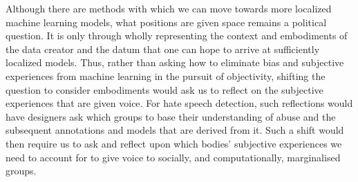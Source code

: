 Although there are methods with which we can move towards more localized machine learning models, what positions are given space remains a political question.
It is only through wholly representing the context and embodiments of the data creator and the datum that one can hope to arrive at sufficiently localized models. Thus, rather than asking how to eliminate bias and subjective experiences from machine learning in the pursuit of objectivity, shifting the question to consider embodiments would ask us to reflect on the subjective experiences that are given voice. For hate speech detection, such reflections would have designers ask which groups to base their understanding of abuse and the subsequent annotations and models that are derived from it. Such a shift would then require us to ask and reflect upon which bodies' subjective experiences we need to account for to give voice to socially, and computationally, marginalised groups.

%
%

